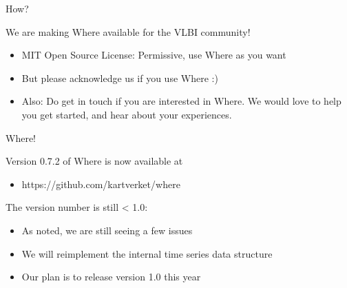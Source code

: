 \documentclass[ignorenonframetext,12pt,t]{beamer}
\begin{document}
\begin{frame}{How?}
  \begin{centering}
    We are making Where available for the VLBI community!
  \end{centering}
  \pause
  
  \begin{itemize}
  \item<2-> MIT Open Source License: Permissive, use Where as you want
  \item<3-> But please acknowledge us if you use Where :)
  \item<4-> Also: Do get in touch if you are interested in Where. We would love to help you get started, and hear about your experiences.
  \end{itemize}

\end{frame}

\begin{frame}{Where!}

  Version 0.7.2 of Where is now available at
  \begin{itemize}
  \item https://github.com/kartverket/where
  \end{itemize}
  \pause

  The version number is still < 1.0:
  \begin{itemize}
  \item As noted, we are still seeing a few issues
  \item We will reimplement the internal time series data structure
  \item Our plan is to release version 1.0 this year
  \end{itemize}

\end{frame}
\end{document}

